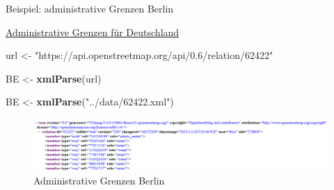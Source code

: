 \documentclass[ignorenonframetext,]{beamer}
\newenvironment{Shaded}{\begin{snugshade}}{\end{snugshade}}
\newcommand{\KeywordTok}[1]{\textcolor[rgb]{0.26,0.66,0.93}{\textbf{#1}}}
\newcommand{\NormalTok}[1]{\textcolor[rgb]{0.74,0.68,0.62}{#1}}
\newcommand{\StringTok}[1]{\textcolor[rgb]{0.02,0.61,0.04}{#1}}
\begin{document}
\begin{frame}[fragile]{Beispiel: administrative Grenzen Berlin}
\protect\hypertarget{beispiel-administrative-grenzen-berlin}{}

\href{http://wiki.openstreetmap.org/wiki/DE:Grenze\#Bundesl.C3.A4ndergrenze_-_admin_level.3D4}{Administrative
Grenzen für Deutschland}

\begin{Shaded}
\begin{Highlighting}[]
\NormalTok{url <-}\StringTok{ "https://api.openstreetmap.org/api/0.6/relation/62422"}
\end{Highlighting}
\end{Shaded}

\begin{Shaded}
\begin{Highlighting}[]
\NormalTok{BE <-}\StringTok{ }\KeywordTok{xmlParse}\NormalTok{(url)}
\end{Highlighting}
\end{Shaded}

\begin{Shaded}
\begin{Highlighting}[]
\NormalTok{BE <-}\StringTok{ }\KeywordTok{xmlParse}\NormalTok{(}\StringTok{"../data/62422.xml"}\NormalTok{)}
\end{Highlighting}
\end{Shaded}

\begin{figure}
\centering
\includegraphics{figure/ExampleAdmBE.PNG}
\caption{Administrative Grenzen Berlin}
\end{figure}

\end{frame}
\end{document}
